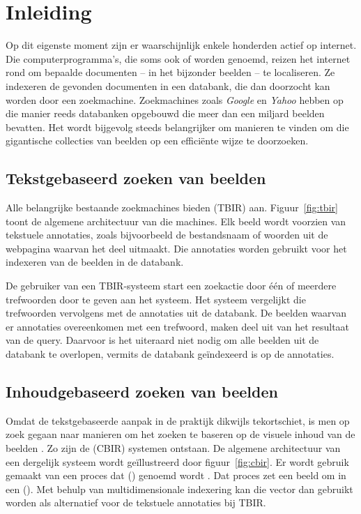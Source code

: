 \chapter{Inleiding}

Op dit eigenste moment zijn er waarschijnlijk enkele honderden  actief op internet.
Die computerprogramma's, die soms ook  of  worden genoemd, reizen
het internet rond om bepaalde documenten -- in het bijzonder beelden -- te localiseren. Ze indexeren
de gevonden documenten in een databank, die dan doorzocht kan worden door een zoekmachine. 
Zoekmachines zoals \emph{Google} en \emph{Yahoo} hebben op die manier reeds databanken
opgebouwd die meer dan een miljard beelden bevatten. Het wordt bijgevolg steeds belangrijker
om manieren te vinden om die gigantische collecties van beelden op een effici\"ente wijze
te doorzoeken.


\section{Tekstgebaseerd zoeken van beelden}

Alle belangrijke bestaande zoekmachines bieden  (TBIR) aan. 
Figuur~\ref{fig:tbir} toont de algemene architectuur van die machines. Elk beeld 
wordt voorzien van tekstuele annotaties, zoals bijvoorbeeld de 
bestandsnaam of woorden uit de webpagina waarvan het deel uitmaakt. Die annotaties
worden gebruikt voor het indexeren van de beelden in de databank.

De gebruiker van een TBIR-systeem start een zoekactie door \'e\'en of meerdere trefwoorden door te geven
aan het systeem. Het systeem vergelijkt die trefwoorden vervolgens met de annotaties uit
de databank. De beelden waarvan er annotaties overeenkomen met een trefwoord, maken
deel uit van het resultaat van de query. Daarvoor is het uiteraard niet nodig om alle beelden
uit de databank te overlopen, vermits de databank ge\"indexeerd is op de annotaties. 

\section{Inhoudgebaseerd zoeken van beelden}

Omdat de tekstgebaseerde aanpak in de praktijk dikwijls tekortschiet, is men op zoek gegaan 
naar manieren om het zoeken te baseren op de visuele inhoud van de beelden 
\cite{smeulders:cbir_end_of_early_years}. Zo zijn de  (CBIR) systemen 
\cite{veltcamp:cbirs} ontstaan. 
De algemene architectuur van een dergelijk systeem wordt ge\"illustreerd door
figuur~\ref{fig:cbir}. Er wordt gebruik gemaakt van een proces dat 
() genoemd wordt \cite{rui:image_retr}. Dat proces zet een beeld om in een 
 (). Met behulp van multidimensionale indexering kan die
vector dan gebruikt worden als alternatief voor de tekstuele annotaties bij TBIR.

